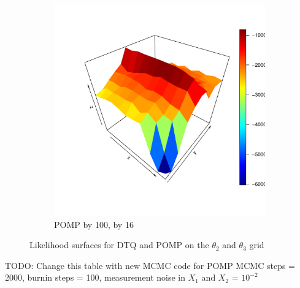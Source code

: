 \documentclass[a4paper,11pt]{article}
\begin{document}
\begin{figure}[H]
\begin{subfigure}{0.48\textwidth}
\includegraphics[width=\linewidth]{pomp_by100_by16.pdf}
\caption{POMP by 100, by 16} \label{fig:f}
\end{subfigure}

\caption{Likelihood surfaces for DTQ and POMP on the $\theta_2$ and $\theta_3$ grid}
\end{figure}





\newpage

TODO: Change this table with new MCMC code for POMP
MCMC steps = 2000, burnin steps = 100, measurement noise in $X_1$ and $X_2$ = $10^{-2}$
\end{document}
